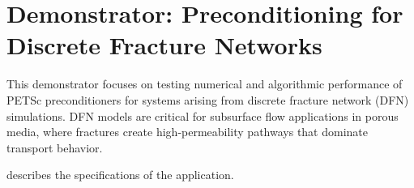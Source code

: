 
\section{Demonstrator: Preconditioning for Discrete Fracture Networks}
\label{sec:app:specs:app-hpddm-dfn}

This demonstrator focuses on testing numerical and algorithmic performance of PETSc preconditioners for systems arising from discrete fracture network (DFN) simulations. DFN models are critical for subsurface flow applications in porous media, where fractures create high-permeability pathways that dominate transport behavior.

 describes the specifications of the application.

